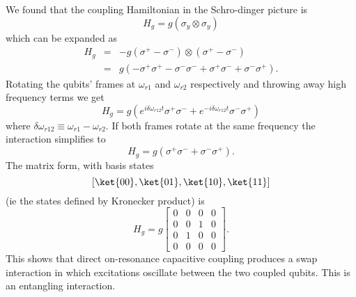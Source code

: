 We found that the coupling Hamiltonian in the Schro-dinger picture is \begin{equation}
H_g = g \left( \sigma_y \otimes \sigma_y \right) \end{equation}
which can be expanded as \begin{eqnarray}
H_g &=& -g (\sigma^+ - \sigma^-) \otimes (\sigma^+ - \sigma^-) \nonumber \\
&=& g \left(-\sigma^+ \sigma^+ - \sigma^- \sigma^- + \sigma^+ \sigma^- + \sigma^- \sigma^+ \right). \end{eqnarray}
Rotating the qubits' frames at $\omega_{r1}$ and $\omega_{r2}$ respectively and throwing away high frequency terms we get \begin{equation}
H_g = g \left( e^{i \delta\omega_{r12} t} \sigma^+ \sigma^- + e^{-i \delta\omega_{r12} t} \sigma^- \sigma^+ \right) \end{equation}
where $\delta\omega_{r12}\equiv \omega_{r1} - \omega_{r2}$.
If both frames rotate at the same frequency the interaction simplifies to \begin{equation}
H_g = g \left( \sigma^+ \sigma^- + \sigma^- \sigma^+ \right). \end{equation}
The matrix form, with basis states \begin{equation}
\left[ \ket{00}, \ket{01}, \ket{10}, \ket{11} \right] \nonumber \end{equation}
(ie the states defined by Kronecker product) is \begin{equation}
H_g = g \left[ \begin{array}{cccc} 0 & 0 & 0 & 0 \\ 0 & 0 & 1 & 0 \\ 0 & 1 & 0 & 0 \\ 0 & 0 & 0 & 0 \end{array} \right]. \end{equation}
This shows that direct on-resonance capacitive coupling produces a swap interaction in which excitations oscillate between the two coupled qubits.
This is an entangling interaction.
